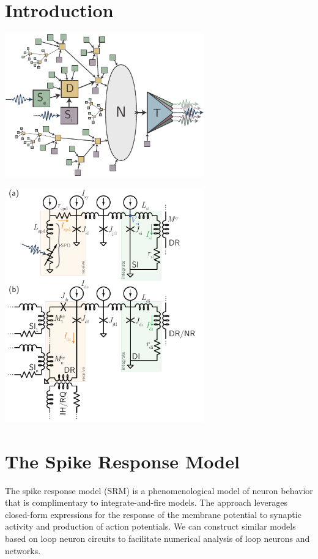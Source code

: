 \documentclass[]{article}
\begin{document}
\begin{multicols}{2}

\setcounter{tocdepth}{4}
\setcounter{secnumdepth}{4}
\tableofcontents

\section{\label{sec:introduction}Introduction}

\includegraphics[width=8.6cm]{_01__schematic.pdf}

\includegraphics[width=8.6cm]{_02__circuits.pdf}

\cite{sh2019_jap}

\section{\label{sec:spike_response_model}The Spike Response Model}
The spike response model (SRM) is a phenomenological model of neuron behavior that is complimentary to integrate-and-fire models. The approach leverages closed-form expressions for the response of the membrane potential to synaptic activity and production of action potentials. We can construct similar models based on loop neuron circuits to facilitate numerical analysis of loop neurons and networks.


\end{multicols}
\end{document}
